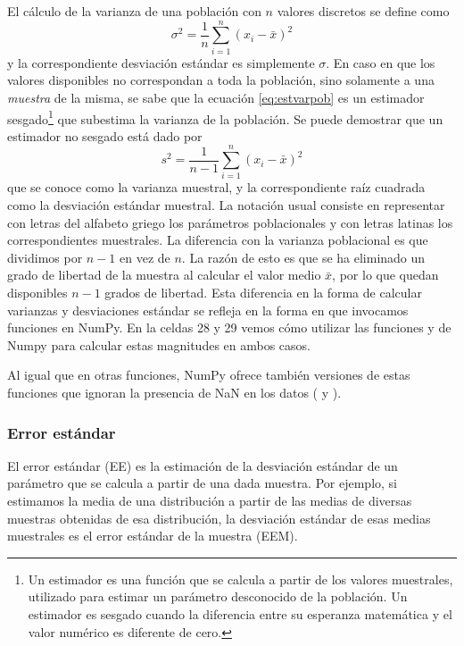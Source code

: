 El cálculo de la varianza de una población con $n$ valores discretos se define como 
\begin{equation}\label{eq:estvarpob}
 \sigma^2 = \frac{1}{n} \sum_{i=1}^n (x_i - \bar{x})^2
\end{equation} 
y la correspondiente desviación estándar es simplemente $\sigma$. En caso en que los valores disponibles no correspondan a toda la población, sino solamente a una \textit{muestra} de la misma, se sabe que la ecuación \eqref{eq:estvarpob} es un estimador sesgado\footnote{Un estimador es una función que se calcula a partir de los valores muestrales, utilizado para estimar un parámetro desconocido de la población. Un estimador es sesgado cuando la diferencia entre su esperanza matemática y el valor numérico es diferente de cero.} que subestima la varianza de la población. Se puede demostrar que un estimador no sesgado está dado por 
\begin{equation}\label{eq:estvarsam}
 s^2 = \frac{1}{n-1} \sum_{i=1}^n (x_i - \bar{x})^2
\end{equation} 
que se conoce como la varianza muestral, y la correspondiente raíz cuadrada como la desviación estándar muestral. La notación usual consiste en representar con letras del alfabeto griego los parámetros poblacionales y con letras latinas los correspondientes muestrales. La diferencia con la varianza poblacional es que dividimos por $n-1$ en vez de $n$. La razón de esto es que se ha eliminado un grado de libertad de la muestra al calcular el valor medio $\bar{x}$, por lo que quedan disponibles $n-1$ grados de libertad. Esta diferencia en la forma de calcular varianzas y desviaciones estándar se refleja en la forma en que invocamos funciones en NumPy. En la celdas 28 y 29 vemos cómo utilizar las funciones  y  de Numpy para calcular estas magnitudes en ambos casos.


Al igual que en otras funciones, NumPy ofrece también versiones de estas funciones que ignoran la presencia de NaN en los datos ( y ).


\subsubsection{Error estándar}

El error estándar (EE) es la estimación de la desviación estándar de un parámetro que se calcula a partir de una dada muestra. Por ejemplo, si estimamos la media de una distribución a partir de las medias de diversas muestras obtenidas de esa distribución, la desviación estándar de esas medias muestrales es el error estándar de la muestra (EEM).

